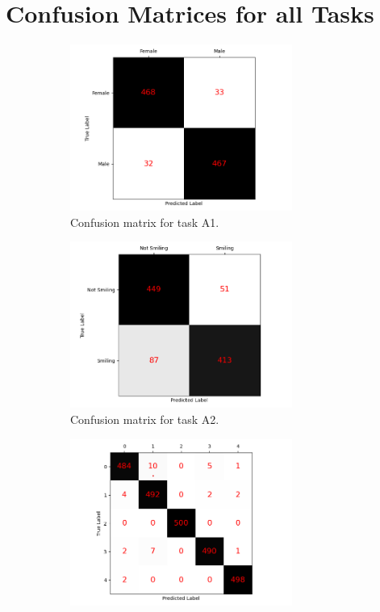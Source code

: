 \documentclass{article}
\begin{document}
\clearpage
\section{Confusion Matrices for all Tasks}
\label{sec:confusion_matrices}

	\begin{figure}[H]
		\begin{subfigure}{0.5\textwidth}
			\centering
			\includegraphics[width=0.8\textwidth]{a1_confusion_matrix.png}
			\caption{Confusion matrix for task A1.}
			\label{fig:a1_confusion_matrix}	
		\end{subfigure}
		\begin{subfigure}{0.5\textwidth}
			\centering
			\includegraphics[width=0.8\textwidth]{a2_confusion_matrix.png}
			\caption{Confusion matrix for task A2.}
			\label{fig:a2_confusion_matrix}	
		\end{subfigure}
		\begin{subfigure}{0.5\textwidth}
			\centering
			\includegraphics[width=0.8\textwidth]{b1_confusion_matrix.png}

\end{subfigure}
\end{figure}
\end{document}
